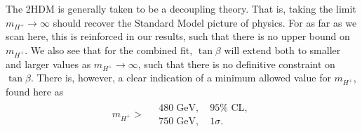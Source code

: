 \documentclass[a4paper,12pt]{article}
\begin{document}
The 2HDM is generally taken to be a decoupling theory. 
That is, taking the limit $m_{H^+} \to \infty$ should recover the Standard Model picture of physics.
For as far as we scan here, this is reinforced in our results, such that there is no upper bound on $m_{H^+}$. 
We also see that for the combined fit, $\tan\beta$ will extend both to smaller and larger values as $m_{H^+}\to\infty$, such that there is no definitive constraint on $\tan\beta$. 
There is, however, a clear indication of a minimum allowed value for $m_{H^+}$, found here as
\begin{align}
    \label{eq:const}
    m_{H^+} >
    \begin{split}
         &\; 480 \;\text{GeV},\quad 95\% \text{ CL},\\
         &\; 750 \;\text{GeV},\quad 1\sigma.
    \end{split}
\end{align}
\end{document}
